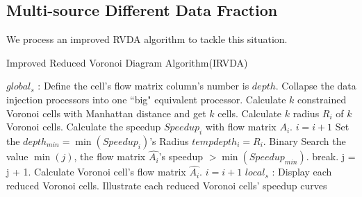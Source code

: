 \subsection{Multi-source Different Data Fraction}

We process an improved RVDA algorithm to tackle this situation. 

\begin{algorithm}
\caption{Improved Reduced Voronoi Diagram Algorithm(IRVDA)}
\begin{algorithmic} 
\renewcommand{\algorithmicrequire}{\textbf{Input: $n$ data injection position}}
\renewcommand{\algorithmicensure}{\textbf{Output: $n$ reduced Voronoi cells and $m*n$ processor data fractions}}
\STATE $global_{s}$ :
\STATE Define the cell's flow matrix column's number is $depth$.
\STATE Collapse the data injection processors into one ``big" equivalent processor.
\STATE Calculate $k$ constrained Voronoi cells\cite{chin1998finding} with Manhattan distance and get $k$ cells.
\STATE Calculate $k$ radius $R_{i}$ of $k$ Voronoi cells.
\STATE Calculate the speedup $Speedup_{i}$ with flow matrix $A_{i}$.
\STATE $ i = i + 1$
\ENDWHILE
\STATE Set the $depth_{min} = \min(Speedup_{i})$'s Radius
\STATE $tempdepth_{i} = R_{i}$.
\STATE Binary Search the  value $\min (j)$, the flow matrix $\hat{A_{i}}$'s speedup $ > \min(Speedup_{min})$. 
\STATE  break.
\STATE j = j + 1.
\ENDWHILE
\STATE Calculate Voronoi cell's flow matrix $\hat{A_{i}}$.
\STATE $ i = i + 1$
\ENDWHILE
\STATE $local_{s}$ :
\STATE Display each reduced Voronoi cells.
\STATE Illustrate each reduced Voronoi cells' speedup curves
\end{algorithmic}
\end{algorithm}
\newpage